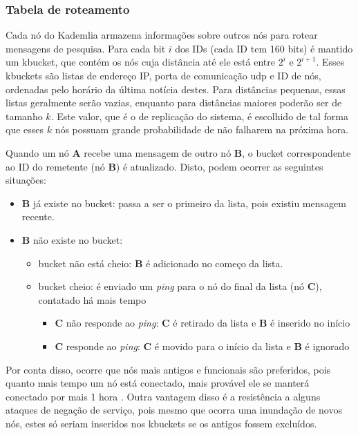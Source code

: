 
\subsubsection*{Tabela de roteamento}

Cada nó do Kademlia armazena informações sobre outros nós para rotear mensagens de
pesquisa. Para cada bit $i$ dos IDs (cada ID tem 160 bits) é mantido um \gls{kbucket},
que contém os nós cuja distância até ele está entre $2^i$ e $2^{i+1}$. Esses
\glspl*{kbucket} são listas de endereço IP, porta de comunicação \gls*{udp} e ID de
nós, ordenadas pelo horário da última notícia destes. Para distâncias pequenas, essas
listas geralmente serão vazias, enquanto para distâncias maiores poderão ser de tamanho
$k$. Este valor, que é o de replicação do sistema, é escolhido de tal forma que esses
$k$ nós possuam grande probabilidade de não falharem na próxima hora.

Quando um nó \textbf{A} recebe uma mensagem de outro nó \textbf{B}, o \gls*{bucket}
correspondente ao ID do remetente (nó \textbf{B}) é atualizado. Disto, podem ocorrer as
seguintes situações:

\begin{itemize}
    \item \textbf{B} já existe no \gls*{bucket}: passa a ser o primeiro da lista, pois
        existiu mensagem recente.

    \item \textbf{B} não existe no \gls*{bucket}:
        \begin{itemize}
            \item \gls*{bucket} não está cheio: \textbf{B} é adicionado no começo da
                lista.
            \item \gls*{bucket} cheio: é enviado um \emph{ping} para o nó do final da
                lista (nó \textbf{C}), contatado há mais tempo

            \begin{itemize}
                \item \textbf{C} não responde ao \emph{ping}: \textbf{C} é retirado da
                lista e \textbf{B} é inserido no início
                \item \textbf{C} responde ao \emph{ping}: \textbf{C} é movido para o
                início da lista e \textbf{B} é ignorado
            \end{itemize}
        \end{itemize}

\end{itemize}

Por conta disso, ocorre que nós mais antigos e funcionais são preferidos, pois quanto
mais tempo um nó está conectado, mais provável ele se manterá conectado por mais 1 hora
\cite{artigo:gnutella-uptime}. Outra vantagem disso é a resistência a alguns ataques de
negação de serviço, pois mesmo que ocorra uma inundação de novos nós, estes só seriam
inseridos nos \glspl*{kbucket} se os antigos fossem excluídos.